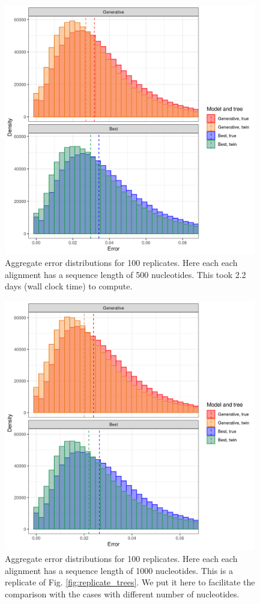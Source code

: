 \begin{figure}[H]
  \includegraphics[width=0.98\textwidth]{pirouette_example_19/errors.png}
  \caption{Aggregate error distributions for 100 replicates. 
    Here each each alignment has a sequence length of 500 nucleotides. 
    This took 2.2 days (wall clock time) to compute.}
  \label{fig:example_500_nucleotides}
\end{figure}

\begin{figure}[H]
  \includegraphics[width=0.98\textwidth]{pirouette_example_28/errors.png}
  \caption{Aggregate error distributions for 100 replicates. 
    Here each each alignment has a sequence length of 1000 nucleotides.
    This is a replicate of Fig. \ref{fig:replicate_trees}. We put it here to facilitate the comparison with the cases with different number of nucleotides.}
  \label{fig:example_1000_nucleotides}
\end{figure}

